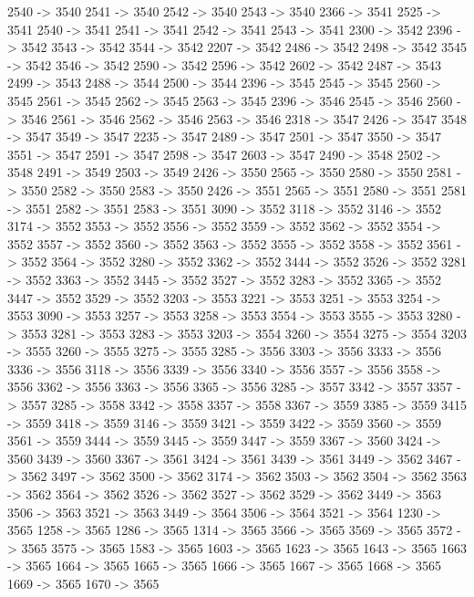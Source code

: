 {	2540 -> 3540
	2541 -> 3540
	2542 -> 3540
	2543 -> 3540
	2366 -> 3541
	2525 -> 3541
	2540 -> 3541
	2541 -> 3541
	2542 -> 3541
	2543 -> 3541
	2300 -> 3542
	2396 -> 3542
	3543 -> 3542
	3544 -> 3542
	2207 -> 3542
	2486 -> 3542
	2498 -> 3542
	3545 -> 3542
	3546 -> 3542
	2590 -> 3542
	2596 -> 3542
	2602 -> 3542
	2487 -> 3543
	2499 -> 3543
	2488 -> 3544
	2500 -> 3544
	2396 -> 3545
	2545 -> 3545
	2560 -> 3545
	2561 -> 3545
	2562 -> 3545
	2563 -> 3545
	2396 -> 3546
	2545 -> 3546
	2560 -> 3546
	2561 -> 3546
	2562 -> 3546
	2563 -> 3546
	2318 -> 3547
	2426 -> 3547
	3548 -> 3547
	3549 -> 3547
	2235 -> 3547
	2489 -> 3547
	2501 -> 3547
	3550 -> 3547
	3551 -> 3547
	2591 -> 3547
	2598 -> 3547
	2603 -> 3547
	2490 -> 3548
	2502 -> 3548
	2491 -> 3549
	2503 -> 3549
	2426 -> 3550
	2565 -> 3550
	2580 -> 3550
	2581 -> 3550
	2582 -> 3550
	2583 -> 3550
	2426 -> 3551
	2565 -> 3551
	2580 -> 3551
	2581 -> 3551
	2582 -> 3551
	2583 -> 3551
	3090 -> 3552
	3118 -> 3552
	3146 -> 3552
	3174 -> 3552
	3553 -> 3552
	3556 -> 3552
	3559 -> 3552
	3562 -> 3552
	3554 -> 3552
	3557 -> 3552
	3560 -> 3552
	3563 -> 3552
	3555 -> 3552
	3558 -> 3552
	3561 -> 3552
	3564 -> 3552
	3280 -> 3552
	3362 -> 3552
	3444 -> 3552
	3526 -> 3552
	3281 -> 3552
	3363 -> 3552
	3445 -> 3552
	3527 -> 3552
	3283 -> 3552
	3365 -> 3552
	3447 -> 3552
	3529 -> 3552
	3203 -> 3553
	3221 -> 3553
	3251 -> 3553
	3254 -> 3553
	3090 -> 3553
	3257 -> 3553
	3258 -> 3553
	3554 -> 3553
	3555 -> 3553
	3280 -> 3553
	3281 -> 3553
	3283 -> 3553
	3203 -> 3554
	3260 -> 3554
	3275 -> 3554
	3203 -> 3555
	3260 -> 3555
	3275 -> 3555
	3285 -> 3556
	3303 -> 3556
	3333 -> 3556
	3336 -> 3556
	3118 -> 3556
	3339 -> 3556
	3340 -> 3556
	3557 -> 3556
	3558 -> 3556
	3362 -> 3556
	3363 -> 3556
	3365 -> 3556
	3285 -> 3557
	3342 -> 3557
	3357 -> 3557
	3285 -> 3558
	3342 -> 3558
	3357 -> 3558
	3367 -> 3559
	3385 -> 3559
	3415 -> 3559
	3418 -> 3559
	3146 -> 3559
	3421 -> 3559
	3422 -> 3559
	3560 -> 3559
	3561 -> 3559
	3444 -> 3559
	3445 -> 3559
	3447 -> 3559
	3367 -> 3560
	3424 -> 3560
	3439 -> 3560
	3367 -> 3561
	3424 -> 3561
	3439 -> 3561
	3449 -> 3562
	3467 -> 3562
	3497 -> 3562
	3500 -> 3562
	3174 -> 3562
	3503 -> 3562
	3504 -> 3562
	3563 -> 3562
	3564 -> 3562
	3526 -> 3562
	3527 -> 3562
	3529 -> 3562
	3449 -> 3563
	3506 -> 3563
	3521 -> 3563
	3449 -> 3564
	3506 -> 3564
	3521 -> 3564
	1230 -> 3565
	1258 -> 3565
	1286 -> 3565
	1314 -> 3565
	3566 -> 3565
	3569 -> 3565
	3572 -> 3565
	3575 -> 3565
	1583 -> 3565
	1603 -> 3565
	1623 -> 3565
	1643 -> 3565
	1663 -> 3565
	1664 -> 3565
	1665 -> 3565
	1666 -> 3565
	1667 -> 3565
	1668 -> 3565
	1669 -> 3565
	1670 -> 3565
}
